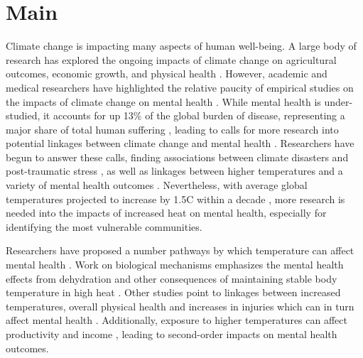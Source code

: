 \documentclass[titlepage]{article}
\begin{document}
\section*{Main}
Climate change is impacting many aspects of human well-being. A large body of research has explored the ongoing impacts of climate change on agricultural outcomes, economic growth, and physical health \citep{pachauri2014climate}. However, academic and medical researchers have highlighted the relative paucity of empirical studies on the impacts of climate change on mental health \citep{Berry2018Apr, Berrang-Ford2021}. While mental health is under-studied, it accounts for up 13\% of the global burden of disease, representing a major share of total human suffering \citep{Collins2011Jul}, leading to calls for more research into potential linkages between climate change and mental health \citep{Berry2018Apr, Collins2011Jul}. Researchers have begun to answer these calls, finding associations between climate disasters and post-traumatic stress \citep{Schwartz2017Aug}, as well as linkages between higher temperatures and a variety of mental health outcomes \citep{baylis_weather_2018, Mullins2019Dec, Obradovich2018Oct}. Nevertheless, with average global temperatures projected to increase by 1.5\textdegree C within a decade \citep{allen2019technical}, more research is needed into the impacts of increased heat on mental health, especially for identifying the most vulnerable communities.

Researchers have proposed a number pathways by which temperature can affect mental health \citep{Berry2018Apr, Palinkas2020Apr}. Work on biological mechanisms emphasizes the mental health effects from dehydration and other consequences of maintaining stable body temperature in high heat \citep{Lohmus2018Jul}. Other studies point to linkages between increased temperatures, overall physical health and increases in injuries which can in turn affect mental health \citep{Berry2007}. Additionally, exposure to higher temperatures can affect productivity and income \citep{Burke2015Nov}, leading to second-order impacts on mental health outcomes.
\end{document}

